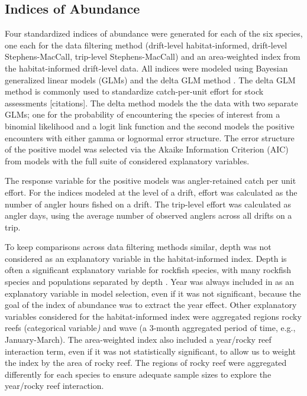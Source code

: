 \documentclass[
  12pt,
  authoryear,
  preprint,
  3p]{elsarticle}
\begin{document}
\hypertarget{indices-of-abundance}{%
\subsection{Indices of Abundance}\label{indices-of-abundance}}

Four standardized indices of abundance were generated for each of the
six species, one each for the data filtering method (drift-level
habitat-informed, drift-level Stephens-MacCall, trip-level
Stephens-MacCall) and an area-weighted index from the habitat-informed
drift-level data. All indices were modeled using Bayesian generalized
linear models (GLMs) and the delta GLM method
\citep{Lo:1992:IRA, Stefansson:1996:AGS}. The delta GLM method is
commonly used to standardize catch-per-unit effort for stock assessments
{[}citations{]}. The delta method models the the data with two separate
GLMs; one for the probability of encountering the species of interest
from a binomial likelihood and a logit link function and the second
models the positive encounters with either gamma or lognormal error
structure. The error structure of the positive model was selected via
the Akaike Information Criterion (AIC) from models with the full suite
of considered explanatory variables.

The response variable for the positive models was angler-retained catch
per unit effort. For the indices modeled at the level of a drift, effort
was calculated as the number of angler hours fished on a drift. The
trip-level effort was calculated as angler days, using the average
number of observed anglers across all drifts on a trip.

To keep comparisons across data filtering methods similar, depth was not
considered as an explanatory variable in the habitat-informed index.
Depth is often a significant explanatory variable for rockfish species,
with many rockfish species and populations separated by depth
\citep{Love:2002:RNP}. Year was always included in as an explanatory
variable in model selection, even if it was not significant, because the
goal of the index of abundance was to extract the year effect. Other
explanatory variables considered for the habitat-informed index were
aggregated regions rocky reefs (categorical variable\emph{)} and wave (a
3-month aggregated period of time, e.g., January-March). The
area-weighted index also included a year/rocky reef interaction term,
even if it was not statistically significant, to allow us to weight the
index by the area of rocky reef. The regions of rocky reef were
aggregated differently for each species to ensure adequate sample sizes
to explore the year/rocky reef interaction.
\end{document}
